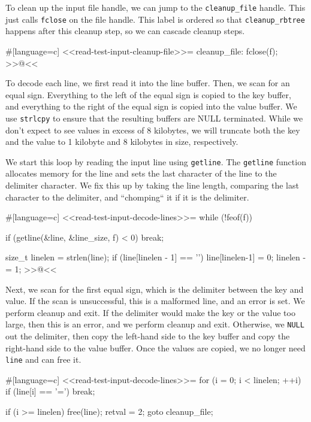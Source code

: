 {To clean up the input file handle, we can jump to the \verb/cleanup_file/
handle. This just calls \verb/fclose/ on the file handle. This label is ordered
so that \verb/cleanup_rbtree/ happens after this cleanup step, so we can cascade
cleanup steps.

#[language=c]
<<read-test-input-cleanup-file>>=
cleanup_file:
    fclose(f);
>>@<<

To decode each line, we first read it into the line buffer. Then, we scan for an
equal sign. Everything to the left of the equal sign is copied to the key
buffer, and everything to the right of the equal sign is copied into the value
buffer. We use \verb/strlcpy/ to ensure that the resulting buffers are NULL
terminated. While we don't expect to see values in excess of 8 kilobytes, we
will truncate both the key and the value to 1 kilobyte and 8 kilobytes in size,
respectively.

We start this loop by reading the input line using \verb/getline/. The
\verb/getline/ function allocates memory for the line and sets the last
character of the line to the delimiter character. We fix this up by taking the
line length, comparing the last character to the delimiter, and ``chomping`` it
if it is the delimiter.

#[language=c]
<<read-test-input-decode-lines>>=
    while (!feof(f))
    {
        if (getline(&line, &line_size, f) < 0)
        {
            break;
        }

        size_t linelen = strlen(line);
        if (line[linelen - 1] == '\n')
        {
            line[linelen-1] = 0;
            linelen -= 1;
        }
>>@<<

\newpage

Next, we scan for the first equal sign, which is the delimiter between the key
and value. If the scan is unsuccessful, this is a malformed line, and an error
is set. We perform cleanup and exit.  If the delimiter would make the key or the
value too large, then this is an error, and we perform cleanup and exit.
Otherwise, we \verb/NULL/ out the delimiter, then copy the left-hand side to the
key buffer and copy the right-hand side to the value buffer. Once the values are
copied, we no longer need \verb/line/ and can free it.

#[language=c]
<<read-test-input-decode-lines>>=
        for (i = 0; i < linelen; ++i)
            if (line[i] == '=')
                break;

        if (i >= linelen)
        {
            free(line);
            retval = 2;
            goto cleanup_file;
        }

}}
